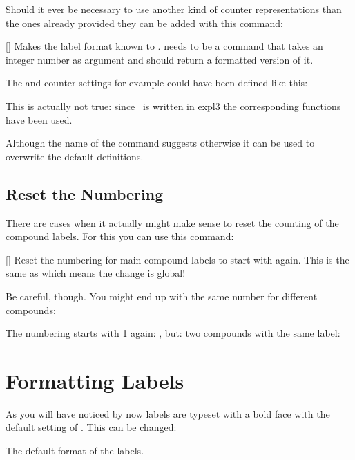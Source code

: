 \documentclass[load-preamble+,babel-options={ngerman,british,american}]{cnltx-doc}
\begin{document}
Should it ever be necessary to use another kind of counter representations
than the ones already provided they can be added with this command:
\begin{commands}
  []
    Makes the label format  known to \chemnum.  
    needs to be a command that takes an integer number as argument and should
    return a formatted version of it.
\end{commands}
The  and  counter settings for example could have been
defined like this:
\begin{sourcecode}
    {\@alph}
\end{sourcecode}
This is actually not true: since \chemnum\ is written in expl3 the
corresponding  functions have been used.

Although the name of the command suggests otherwise it can be used to
overwrite the default definitions.

\subsection{Reset the Numbering}\label{sec:reset-numbering}

There are cases when it actually might make sense to reset the counting of the
compound labels.  For this you can use this command:
\begin{commands}
  []
    Reset the numbering for main compound labels to start with 
    again.  This is the same as
     which
    means the change is global!
\end{commands}

Be careful, though.  You might end up with the same number for different
compounds:
\begin{example}
   \resetcmpd The numbering starts with 1 again: , but:
    two compounds with the same label: 
\end{example}

\section{Formatting Labels}\label{sec:formatting-labels}

As you will have noticed by now labels are typeset with a bold face with the
default setting of \chemnum.  This can be changed:
\begin{options}
    The default format of the labels.
\end{options}
\end{document}
